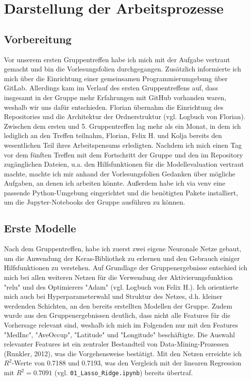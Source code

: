 \documentclass[9pt,a4paper,twocolumn,twoside]{tau-class/tau}
\begin{document}

\section{Darstellung der Arbeitsprozesse}
\subsection{Vorbereitung}
Vor unserem ersten Gruppentreffen habe ich mich mit der Aufgabe vertraut gemacht und bin die Vorlesungsfolien durchgegangen.
Zusätzlich informierte ich mich über die Einrichtung einer gemeinsamen Programmierumgebung über GitLab. Allerdings kam im Verlauf des 
ersten Gruppentreffens auf, dass insgesamt in der Gruppe mehr Erfahrungen mit GitHub vorhanden waren, weshalb wir uns dafür 
entschieden. Florian übernahm die Einrichtung des Repositories und die Architektur der Ordnerstruktur (vgl. Logbuch von Florian).
\\
Zwischen dem ersten und 5. Gruppentreffen lag mehr als ein Monat, in dem ich lediglich an den Treffen teilnahm, Florian, Felix H. und Kolja bereits den wesentlichen Teil 
ihres Arbeitspensums erledigten. 
Nachdem ich mich einen Tag vor dem fünften Treffen mit dem Fortschritt der Gruppe und den im Repository zugänglichen Dateien, u.a. den Hilfsfunktionen für die Modellevaluation vertraut machte,
machte ich mir anhand der Vorlesungsfolien Gedanken über mögliche Aufgaben, an denen ich arbeiten könnte. Außerdem habe ich via venv eine 
passende Python-Umgebung eingerichtet und die benötigten Pakete installiert, um die Jupyter-Notebooks der Gruppe ausführen zu können.

\subsection{Erste Modelle}
Nach dem Gruppentreffen, habe ich zuerst zwei eigene Neuronale Netze gebaut, um die Anwendung der Keras-Bibliothek zu erlernen und den Gebrauch einiger Hilfsfunktionen zu verstehen.
Auf Grundlage der Gruppenergebnisse entschied ich mich bei allen weiteren Netzen für die Verwendung der Aktivierungsfunktion "relu" und des Optimierers "Adam" (vgl. Logbuch von Felix H.).
Ich orientierte mich auch bei Hyperparameterwahl und Struktur des Netzes, d.h. kleiner werdenden Schichten, an den bereits erstellten Modellen der Gruppe. Zudem wurde aus den Gruppenergebnissen
deutlich, dass nicht alle Features für die Vorhersage relevant sind, weshalb ich mich im Folgenden nur mit den Features "MedInc", "AveOccup", "Latitude" und "Longitude" beschäftigte.
Die Auswahl relevanter Features ist ein zentraler Bestandteil von Data-Mining-Prozessen (Runkler, 2012), was die Vorgehensweise bestätigt.
Mit den Netzen erreichte ich  $R^2$-Werte von 0.7188 und 0.7193, was den Vergleich mit der linearen Regression mit $R^2 = 0.7091$ (vgl. \texttt{01\_Lasso\_Ridge.ipynb}) bereits übertraf.
\end{document}
